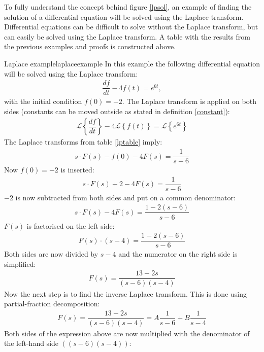 \noindent To fully understand the concept behind figure \ref{lpsol}, an example of finding the solution of a differential equation will be solved using the Laplace transform. Differential equations can be difficult to solve without the Laplace transform, but can easily be solved using the Laplace transform. A table with the results from the previous examples and proofs is constructed above.

\begin{example}{Laplace example}{laplaceexample}
In this example the following differential equation will be solved using the Laplace transform:
\begin{align}
\dfrac{df}{dt}-4f(t)=e^{6t}, \label{lpexinieq}
\end{align} 
with the initial condition $f(0)=-2$. The Laplace transform is applied on both sides (constants can be moved outside as stated in definition \ref{constant}):
\begin{align*}
\mathcal{L} \left\{\dfrac{df}{dt} \right\}-4 
\mathcal{L} \left\{f(t) \right\} = 
\mathcal{L} \left\{e^{6t} \right\}
\end{align*}
The Laplace transforms from table \ref{lptable} imply:
\begin{align*}
s \cdot F(s) - f(0) - 4F(s)= \dfrac{1}{s-6}
\end{align*}
Now $f(0)=-2$ is inserted:
\begin{align*}
s \cdot F(s) + 2 - 4F(s)= \dfrac{1}{s-6}
\end{align*}
$-2$ is now subtracted from both sides and put on a common denominator:
\begin{align*}
s \cdot F(s) - 4F(s)= \dfrac{1-2(s-6)}{s-6}
\end{align*}
$F(s)$ is factorised on the left side:
\begin{align*}
F(s) \cdot (s-4) = \dfrac{1-2(s-6)}{s-6}
\end{align*}
Both sides are now divided by $s-4$ and the numerator on the right side is simplified:
\begin{align*}
F(s) = \dfrac{13-2s}{(s-6)(s-4)}
\end{align*}
Now the next step is to find the inverse Laplace transform. This is done using partial-fraction decomposition: \cite[p. 537]{calc}
\begin{align}
F(s) = \dfrac{13-2s}{(s-6)(s-4)} = A \dfrac{1}{s-6} + B \dfrac{1}{s-4}
\label{par_dec}
\end{align}
Both sides of the expression above are now multiplied with the denominator of the left-hand side $((s-6)(s-4))$:

\end{example}
